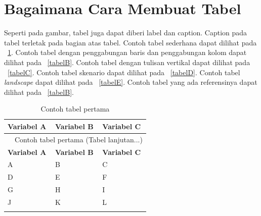 \section{Bagaimana Cara Membuat Tabel}
Seperti pada gambar, tabel juga dapat diberi label dan caption. Caption pada tabel terletak pada bagian atas tabel. Contoh tabel sederhana dapat dilihat pada \tab~\ref{tabelA}. Contoh tabel dengan penggabungan baris dan penggabungan kolom dapat dilihat pada \tab~\ref{tabelB}. Contoh tabel dengan tulisan vertikal dapat dilihat pada \tab~\ref{tabelC}. Contoh tabel skenario dapat dilihat pada \tab~\ref{tabelD}. Contoh tabel \textit{landscape} dapat dilihat pada \tab~\ref{tabelE}. Contoh tabel yang ada referensinya dapat dilihat pada \tab~\ref{tabelB}.

{
\fontsize{10}{12}\selectfont
\begin{longtable}{p{3cm} p{3cm} p{3cm}}
	\caption{Contoh tabel pertama}\\
	\hline
	\textbf{Variabel A} & \textbf{Variabel B} & \textbf{Variabel C}\\
	\hline
	\endfirsthead

	\multicolumn{3}{c}{\tablename\ \thetable\ Contoh tabel pertama \space (Tabel lanjutan...)} \\
	\hline
	\textbf{Variabel A} & \textbf{Variabel B} & \textbf{Variabel C}\\
	\hline
	\endhead

	A & B & C\\
	D & E & F\\
	G & H & I\\
	J & K & L\\ \hline

\label{tabelA}
\end{longtable}
}

